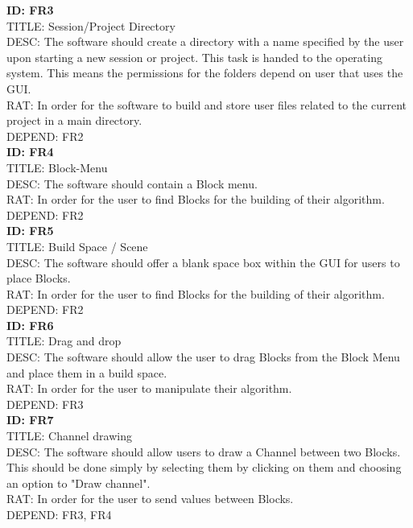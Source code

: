 \documentclass[journal,10pt,onecolumn,compsoc]{IEEEtran} \usepackage[margin=1.0in]{geometry} \usepackage{pdfpages} \usepackage{graphicx}
\begin{document}
\noindent
\textbf{ID: FR3}\\
TITLE: Session/Project Directory\\
DESC: The software should create a directory with a name specified by the user upon starting a new session or project.
This task is handed to the operating system. This means the permissions for the folders depend on user that uses the GUI. \\
RAT: In order for the software to build and store user files related to the current project in a main directory.\\
DEPEND: FR2\\

\noindent
\textbf{ID: FR4}\\
TITLE: Block-Menu\\
DESC: The software should contain a Block menu.\\
RAT: In order for the user to find Blocks for the building of their algorithm.\\
DEPEND: FR2\\

\noindent
\textbf{ID: FR5}\\
TITLE: Build Space / Scene\\
DESC: The software should offer a blank space box within the GUI for users to place Blocks.\\
RAT: In order for the user to find Blocks for the building of their algorithm.\\
DEPEND: FR2\\

\noindent
\textbf{ID: FR6}\\
TITLE: Drag and drop\\
DESC: The software should allow the user to drag Blocks from the Block Menu and place them in a build space.\\
RAT: In order for the user to manipulate their algorithm.\\
DEPEND: FR3\\

\noindent
\textbf{ID: FR7}\\
TITLE: Channel drawing\\
DESC: The software should allow users to draw a Channel between two Blocks. 
This should be done simply by selecting them by clicking on them and choosing an option to "Draw channel".\\
RAT: In order for the user to send values between Blocks.\\
DEPEND: FR3, FR4\\
\end{document}
